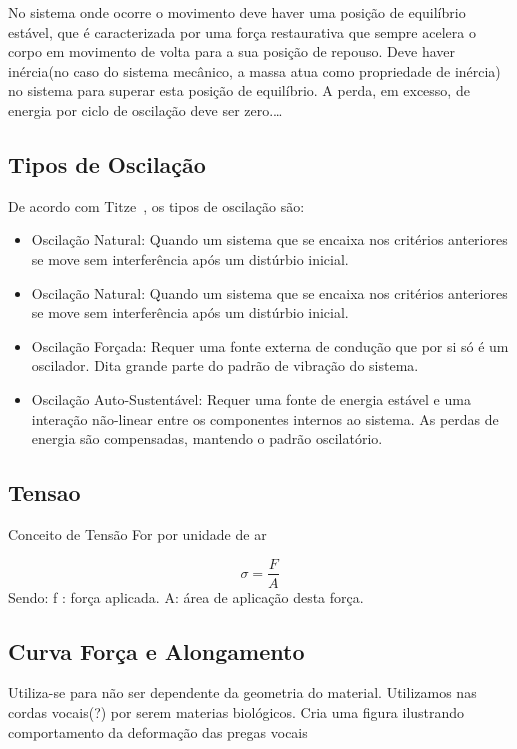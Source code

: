 		
		No sistema onde ocorre o movimento deve haver uma posição de equilíbrio estável, que é caracterizada por uma força restaurativa que sempre acelera o corpo em	movimento de volta para a sua posição de repouso.
		Deve haver inércia(no caso do sistema mecânico, a massa atua como propriedade de inércia) no sistema para superar esta posição de equilíbrio.
		A perda, em excesso, de energia por ciclo de oscilação deve ser zero.\ldots 
	
	\subsection{Tipos de Oscilação}
			De acordo com Titze~\cite{IngoTitze}, os tipos de oscilação são:
			\begin{itemize}
				\item  Oscilação Natural: Quando um sistema que se encaixa nos critérios anteriores se move sem interferência após um distúrbio inicial.
				\item Oscilação Natural: Quando um sistema que se encaixa nos critérios anteriores se move sem interferência após um distúrbio inicial.
				\item Oscilação Forçada: Requer uma fonte externa de condução que por si só é um
				oscilador. Dita grande parte do padrão de vibração do sistema.
				\item Oscilação Auto-Sustentável: Requer uma fonte de energia estável e uma interação não-linear entre os componentes internos ao sistema. As perdas de energia são compensadas, mantendo o padrão oscilatório.
			\end{itemize}
		
	\subsection{Tensao}
		Conceito de Tensão For por unidade de ar
		
		\[
		\sigma = \frac{F}{A}
		\]
		Sendo:
		f : força aplicada. \linebreak
		A: área de aplicação desta força.
		
	\subsection{Curva Força e Alongamento}
		Utiliza-se para não ser dependente da geometria do material. Utilizamos nas cordas vocais(?) por serem materias biológicos. Cria uma figura ilustrando comportamento da deformação das pregas vocais
		
